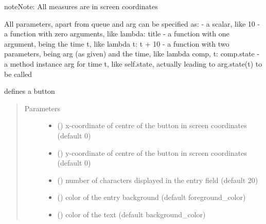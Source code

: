 \documentclass[letterpaper,10pt,english]{sphinxmanual}
\begin{document}
\begin{fulllineitems}
\begin{sphinxadmonition}{note}{Note:}
All measures are in screen coordinates 

All parameters, apart from queue and arg can be specified as: 
- a scalar, like 10 
- a function with zero arguments, like lambda: title 
- a function with one argument, being the time t, like lambda t: t + 10 
- a function with two parameters, being arg (as given) and the time, like lambda comp, t: comp.state 
- a method instance arg for time t, like self.state, actually leading to arg.state(t) to be called
\end{sphinxadmonition}

\end{fulllineitems}


\begin{fulllineitems}
\label{\detokenize{Reference:salabim.AnimateEntry}}
defines a button
\begin{quote}\begin{description}
\item[{Parameters}] \leavevmode\begin{itemize}
\item {} 
 () \textendash{} x-coordinate of centre of the button in screen coordinates (default 0)

\item {} 
 () \textendash{} y-coordinate of centre of the button in screen coordinates (default 0)

\item {} 
 () \textendash{} number of characters displayed in the entry field (default 20)

\item {} 
 () \textendash{} color of the entry background (default foreground\_color)

\item {} 
 () \textendash{} color of the text (default background\_color)


\end{itemize}
\end{description}
\end{quote}
\end{fulllineitems}
\end{document}

